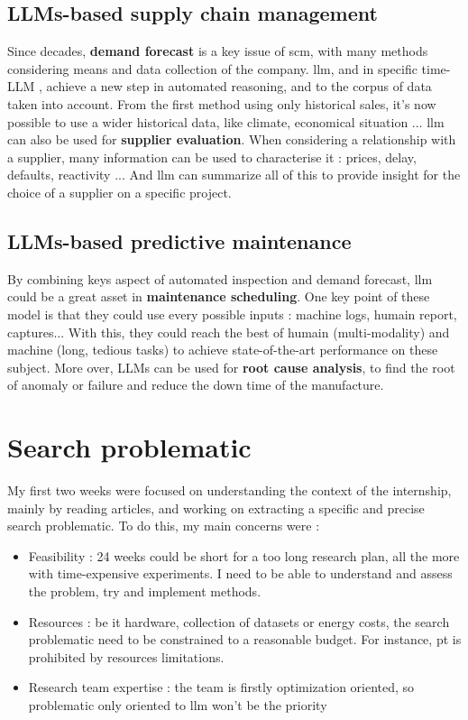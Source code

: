 \subsection{LLMs-based supply chain management}
\label{sec:llm_scm}
Since decades, \textbf{demand forecast} is a key issue of \acrfull{scm}, with many methods considering means and data collection of the company. \acrshort{llm}, and in specific time-LLM \cite{jin_time-llm_2024}, achieve a new step in automated reasoning, and to the corpus of data taken into account. From the first method using only historical sales, it's now possible to use a wider historical data, like climate, economical situation ... \acrshort{llm} can also be used for \textbf{supplier evaluation}. When considering a relationship with a supplier, many information can be used to characterise it : prices, delay, defaults, reactivity ... And \acrshort{llm} can summarize all of this to provide insight for the choice of a supplier on a specific project.   


\subsection{LLMs-based predictive maintenance}
\label{sec:llm_pred_maint}
By combining keys aspect of automated inspection and demand forecast, \acrshort{llm} could be a great asset in \textbf{maintenance scheduling}. One key point of these model is that they could use every possible inputs : machine logs, humain report, captures... With this, they could reach the best of humain (multi-modality) and machine (long, tedious tasks) to achieve state-of-the-art performance on these subject. More over, LLMs can be used for \textbf{root cause analysis}, to find the root of anomaly or failure and reduce the down time of the manufacture. 

\section{Search problematic}
My first two weeks were focused on understanding the context of the internship, mainly by reading articles, and working on extracting a specific and precise search problematic. To do this, my main concerns were : 
\begin{itemize}
    \item Feasibility : 24 weeks could be short for a too long research plan, all the more with time-expensive experiments. I need to be able to understand and assess the problem, try and implement methods.
    \item Resources : be it hardware, collection of datasets or energy costs, the search problematic need to be constrained to a reasonable budget. For instance, \gls{pt} is prohibited by resources limitations.
    \item Research team expertise : the team is firstly optimization oriented, so problematic only oriented to \acrshort{llm} won't be the priority
\end{itemize}

